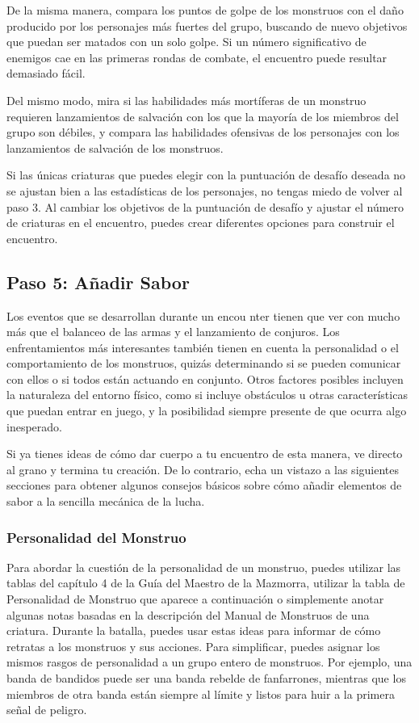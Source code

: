 \documentclass[a4paper,twocolumn,openany,10pt]{dndbook}
\begin{document}
De la misma manera, compara los puntos de golpe de los monstruos con el daño producido por los personajes más fuertes del grupo,
buscando de nuevo objetivos que puedan ser matados con un solo golpe. Si un número significativo de enemigos cae en las primeras
rondas de combate, el encuentro puede resultar demasiado fácil.

Del mismo modo, mira si las habilidades más mortíferas de un monstruo requieren lanzamientos de salvación con los que la mayoría
de los miembros del grupo son débiles, y compara las habilidades ofensivas de los personajes con los lanzamientos de salvación de
los monstruos.

Si las únicas criaturas que puedes elegir con la puntuación de desafío deseada no se ajustan bien a las estadísticas de los
personajes, no tengas miedo de volver al paso 3. Al cambiar los objetivos de la puntuación de desafío y ajustar el número de
criaturas en el encuentro, puedes crear diferentes opciones para construir el encuentro. 

\subsection*{Paso 5: Añadir Sabor}
Los eventos que se desarrollan durante un encou nter tienen que ver con mucho más que el balanceo de las armas y el lanzamiento
de conjuros. Los enfrentamientos más interesantes también tienen en cuenta la personalidad o el comportamiento de los monstruos,
quizás determinando si se pueden comunicar con ellos o si todos están actuando en conjunto. Otros factores posibles incluyen la
naturaleza del entorno físico, como si incluye obstáculos u otras características que puedan entrar en juego, y la posibilidad
siempre presente de que ocurra algo inesperado.

Si ya tienes ideas de cómo dar cuerpo a tu encuentro de esta manera, ve directo al grano y termina tu creación. De lo contrario,
echa un vistazo a las siguientes secciones para obtener algunos consejos básicos sobre cómo añadir elementos de sabor a la
sencilla mecánica de la lucha. 

\subsubsection*{Personalidad del Monstruo}
Para abordar la cuestión de la personalidad de un monstruo, puedes utilizar las tablas del capítulo 4 de la Guía del Maestro de
la Mazmorra, utilizar la tabla de Personalidad de Monstruo que aparece a continuación o simplemente anotar algunas notas basadas
en la descripción del Manual de Monstruos de una criatura. Durante la batalla, puedes usar estas ideas para informar de cómo
retratas a los monstruos y sus acciones. Para simplificar, puedes asignar los mismos rasgos de personalidad a un grupo entero de
monstruos. Por ejemplo, una banda de bandidos puede ser una banda rebelde de fanfarrones, mientras que los miembros de otra banda
están siempre al límite y listos para huir a la primera señal de peligro. 
\end{document}

